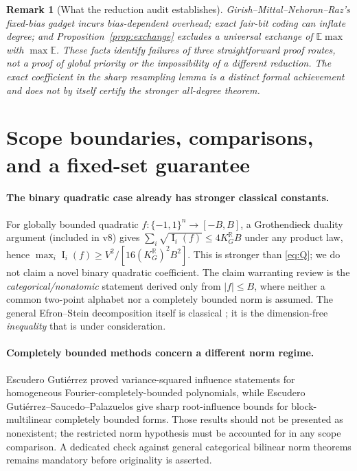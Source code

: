 \documentclass[11pt,letterpaper]{article}
\newtheorem{remark}[theorem]{Remark}
\theoremstyle{definition}\newtheorem{definition}[theorem]{Definition}
\newcommand{\E}{\mathbb E}
\newcommand{\Inf}{\operatorname{I}}
\newcommand{\abs}[1]{\lvert #1\rvert}
\begin{document}
\begin{remark}[What the reduction audit establishes]
Girish--Mittal--Nehoran--Raz's fixed-bias gadget \cite[Theorem~4.3 and Remarks~4.4--4.5]{GMNR2026} incurs bias-dependent overhead; exact fair-bit coding can inflate degree; and Proposition~\ref{prop:exchange} excludes a universal exchange of $\E\max$ with $\max\E$. These facts identify failures of three straightforward proof routes, not a proof of global priority or the impossibility of a different reduction. The exact coefficient in the sharp resampling lemma is a distinct formal achievement and does not by itself certify the stronger all-degree theorem.
\end{remark}

\section{Scope boundaries, comparisons, and a fixed-set guarantee}\label{sec:comparisons}
\paragraph{The binary quadratic case already has stronger classical constants.}
For globally bounded quadratic $f:\{-1,1\}^n\to[-B,B]$, a Grothendieck duality argument (included in v8) gives $\sum_i\sqrt{\Inf_i(f)}\le4K_G^{\mathbb R}B$ under any product law, hence $\max_i\Inf_i(f)\ge V^2/[16(K_G^{\mathbb R})^2B^2]$. This is stronger than \eqref{eq:Q}; we do not claim a novel binary quadratic coefficient. The claim warranting review is the \emph{categorical/nonatomic} statement derived only from $\abs f\le B$, where neither a common two-point alphabet nor a completely bounded norm is assumed. The general Efron--Stein decomposition itself is classical \cite{Blais2008}; it is the dimension-free \emph{inequality} that is under consideration.

\paragraph{Completely bounded methods concern a different norm regime.}
Escudero Guti\'errez \cite{EG2023} proved variance-squared influence statements for homogeneous Fourier-completely-bounded polynomials, while Escudero Guti\'errez--Saucedo--Palazuelos \cite{EGSP2026} give sharp root-influence bounds for block-multilinear completely bounded forms. Those results should not be presented as nonexistent; the restricted norm hypothesis must be accounted for in any scope comparison. A dedicated check against general categorical bilinear norm theorems remains mandatory before originality is asserted.
\end{document}
